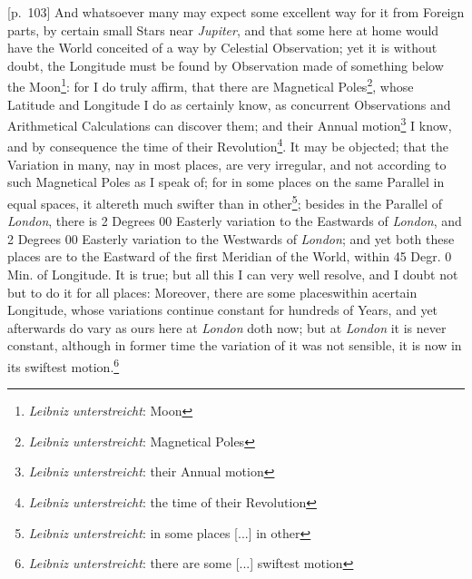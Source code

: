                 \vspace*{8mm}
                \pstart 
                \normalsize
            [p.~103] And whatsoever many may expect some excellent way for it from Foreign parts, by certain small Stars\protect{} near \textit{Jupiter}\protect{}, and that some here at home would have the World conceited of a way by Celestial Observation; yet it is without doubt, the Longitude must be found by Observation made of something below the Moon\protect{}\footnote{\textit{Leibniz unterstreicht}: Moon}: for I do truly affirm, that there are Magnetical Poles\protect{}\footnote{\textit{Leibniz unterstreicht}: Magnetical Poles}, whose Latitude and Longitude I do as certainly know, as concurrent Observations and Arithmetical Calculations can discover them; and their Annual motion\footnote{\textit{Leibniz unterstreicht}: their Annual motion} I know, and by consequence the time of their Revolution\footnote{\textit{Leibniz unterstreicht}: the time of their Revolution}. It may be objected; that the Variation in many, nay in most places, are very irregular, and not according to such Magnetical Poles\protect{} as I speak of; for in some places on the same Parallel in equal spaces, it altereth much swifter than in other\footnote{\textit{Leibniz unterstreicht}: in some places [...] in other}; besides in the Parallel of \textit{London}\protect{}, there is 2 Degrees 00 Easterly variation to the Eastwards of \textit{London}\protect{}, and 2 Degrees 00 Easterly variation to the Westwards of \textit{London}\protect{}; and yet both these places are to the Eastward of the first Meridian of the World, within 45 Degr. 0 Min. of Longitude. It is true; but all this I can  very well resolve, and I doubt not but to do it for all places: Moreover, there are some places\hfill within a\pend \newpage \pstart\noindent certain Longitude, whose variations continue constant for hundreds of Years, and yet afterwards do vary as ours here at \textit{London}\protect{} doth now; but at \textit{London}\protect{} it is never constant, although in former time the variation of it was not sensible, it is now in its swiftest motion.\footnote{\textit{Leibniz unterstreicht}: there are some [...] swiftest motion}\pend 